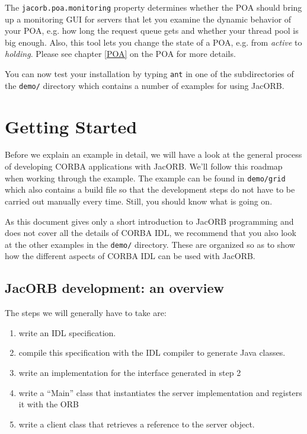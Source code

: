 \documentclass[12pt]{scrbook}
\begin{document}
The  {\tt jacorb.poa.monitoring} property  determines whether  the POA
should bring up a monitoring GUI  for servers that let you examine the
dynamic behavior of  your POA, e.g.  how long  the request queue gets
and whether your thread pool is  big enough.  Also, this tool lets you
change the  state of a POA,  e.g. from {\it active}  to {\it holding}.
Please see chapter \ref{POA} on the POA for more details.

You can now test your installation  by typing {\tt ant} in one of the
subdirectories of the {\tt demo/} directory which contains a number of
examples for using JacORB.


\chapter{Getting Started}
\label{start}

Before we  explain an example  in detail, we  will have a look  at the
general process  of developing  CORBA applications with  JacORB. We'll
follow this roadmap when working through the example.  The example can
be found in  {\tt demo/grid} which also contains a  build file so that
the development  steps do  not have to  be carried out  manually every
time.  Still, you should know what is going on.

As this document gives only a short introduction to JacORB programming
and does not cover all the details of CORBA IDL, we recommend that you
also look at  the other examples in the  {\tt demo/} directory.  These
are organized so as to show how the different aspects of CORBA IDL can
be used with JacORB.

\section{JacORB development: an overview}

The steps we will generally have to take are:

\begin{enumerate}
    \item  write an IDL specification.
    \item  compile this specification with the IDL compiler to generate Java classes.
    \item write an implementation for the interface generated in step
      2
    \item  write a ``Main'' class that instantiates the server implementation
        and registers it with the ORB
    \item  write a client class that retrieves a reference to the server object.
\end{enumerate}
\end{document}
